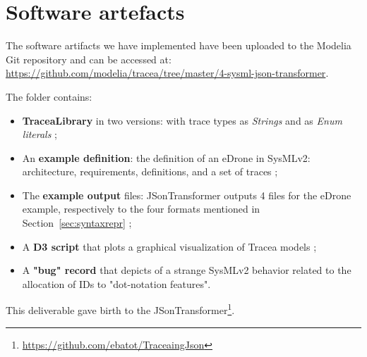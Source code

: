 \section{Software artefacts}\label{sec:artefacts}
The software artifacts we have implemented have been uploaded to the Modelia Git repository and can be accessed at:
\url{https://github.com/modelia/tracea/tree/master/4-sysml-json-transformer}.

The folder contains:
\begin{itemize}
    \item \textbf{TraceaLibrary} in two versions: with trace types as \textit{Strings} and as \textit{Enum literals} ;
    \item An \textbf{example definition}: the definition of an eDrone in SysMLv2: architecture, requirements, definitions, and a set of traces ;
    \item The \textbf{example output} files: JSonTransformer outputs 4 files for the eDrone example, respectively to the four formats mentioned in Section~\ref{sec:syntaxrepr} ;
    \item A \textbf{D3 script} that plots a graphical visualization of Tracea models ;
    \item A \textbf{"bug" record} that depicts of a strange SysMLv2 behavior related to the allocation of IDs to "dot-notation features".
\end{itemize}

This deliverable gave birth to the JSonTransformer\footnote{\url{https://github.com/ebatot/TraceaingJson}}.